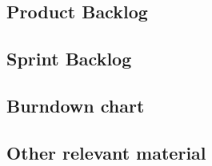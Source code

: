 \documentclass[a4paper,11pt]{article}
\begin{document}
\subsection{Product Backlog}


\subsection{Sprint Backlog}


\subsection{Burndown chart}



\subsection{Other relevant material}

\end{document}
